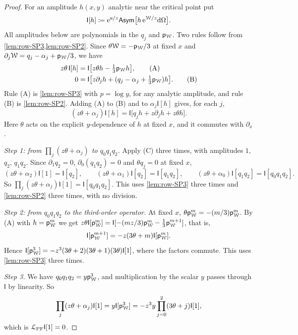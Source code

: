\begin{proof}
For an amplitude $h(x,y)$ analytic near the critical point put
\[
\mathsf{I}[h]\coloneqq\mathrm{e}^{\mathsf{u}/z}\mathsf{Asym}\big[h\,\mathrm{e}^{\mathcal{W}/z}\mathrm{d}\Omega\big].
\]
All amplitudes below are polynomials in the $q_j$ and $\mathsf{p}_{\mathcal{W}}$. Two rules follow from \cref{lem:row-SP3,lem:row-SP2}. Since $\theta\mathcal{W}=-\mathsf{p}_{\mathcal{W}}/3$ at fixed $x$ and $\partial_j\mathcal{W}=q_j-\alpha_j+\mathsf{p}_{\mathcal{W}}/3$, we have
\begin{align}
z\theta\,\mathsf{I}[h]&=\mathsf{I}\big[z\theta h-\tfrac13\mathsf{p}_{\mathcal{W}} h\big], \tag{A}\\
0&=\mathsf{I}\big[z\partial_jh+(q_j-\alpha_j+\tfrac13\mathsf{p}_{\mathcal{W}})h\big]. \tag{B}
\end{align}
Rule (A) is \cref{lem:row-SP3} with $p=\log y$, for any analytic amplitude, and rule (B) is \cref{lem:row-SP2}. Adding (A) to (B) and to $\alpha_j\mathsf{I}[h]$ gives, for each $j$,
\begin{equation}
\tag{C}
(z\theta+\alpha_j)\mathsf{I}[h]=\mathsf{I}\big[q_jh+z\partial_jh+z\theta h\big].
\end{equation}
Here $\theta$ acts on the explicit $y$-dependence of $h$ at fixed $x$, and it commutes with $\partial_x$.

\emph{Step 1: from $\prod_j(z\theta+\alpha_j)$ to $q_0q_1q_2$.} Apply (C) three times, with amplitudes $1$, $q_2$, $q_1q_2$. Since $\partial_1q_2=0$, $\partial_0(q_1q_2)=0$ and $\theta q_j=0$ at fixed $x$,
\[
(z\theta+\alpha_2)\mathsf{I}[1]=\mathsf{I}[q_2],\qquad(z\theta+\alpha_1)\mathsf{I}[q_2]=\mathsf{I}[q_1q_2],\qquad(z\theta+\alpha_0)\mathsf{I}[q_1q_2]=\mathsf{I}[q_0q_1q_2].
\]
So $\prod_j(z\theta+\alpha_j)\mathsf{I}[1]=\mathsf{I}[q_0q_1q_2]$. This uses \cref{lem:row-SP3} three times and \cref{lem:row-SP2} three times, with no division.

\emph{Step 2: from $q_0q_1q_2$ to the third-order operator.} At fixed $x$, $\theta\mathsf{p}_{\mathcal{W}}^m=-(m/3)\mathsf{p}_{\mathcal{W}}^m$. By (A) with $h=\mathsf{p}_{\mathcal{W}}^m$ we get $z\theta\mathsf{I}[\mathsf{p}_{\mathcal{W}}^m]=\mathsf{I}[-(mz/3)\mathsf{p}_{\mathcal{W}}^m-\frac13\mathsf{p}_{\mathcal{W}}^{m+1}]$, that is,
\[
\mathsf{I}[\mathsf{p}_{\mathcal{W}}^{m+1}]=-z(3\theta+m)\mathsf{I}[\mathsf{p}_{\mathcal{W}}^m].
\]
Hence $\mathsf{I}[\mathsf{p}_{\mathcal{W}}^3]=-z^3(3\theta+2)(3\theta+1)(3\theta)\mathsf{I}[1]$, where the factors commute. This uses \cref{lem:row-SP3} three times.

\emph{Step 3.} We have $q_0q_1q_2=y\mathsf{p}_{\mathcal{W}}^3$, and multiplication by the scalar $y$ passes through $\mathsf{I}$ by linearity. So
\[
\prod_j(z\theta+\alpha_j)\mathsf{I}[1]=y\mathsf{I}[\mathsf{p}_{\mathcal{W}}^3]=-z^3y\prod_{j=0}^{2}(3\theta+j)\mathsf{I}[1],
\]
which is $\mathcal{L}_{\mathrm{PF}}\mathsf{I}[1]=0$.
\end{proof}

